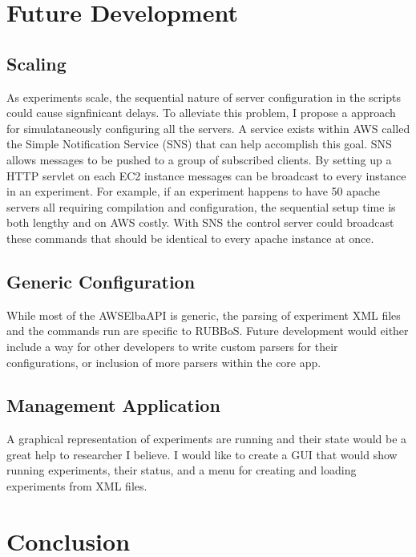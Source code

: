 \documentclass{article}
\begin{document}
\section{Future Development}
\subsection{Scaling}
As experiments scale, the sequential nature of server configuration in the scripts could cause signfinicant delays. To alleviate this problem, I propose a approach for simulataneously configuring all the servers.
A service exists within AWS called the Simple Notification Service (SNS) that can help accomplish this goal. SNS allows messages to be pushed to a group of subscribed clients. By setting up a HTTP servlet on each EC2 instance messages can be broadcast to every instance in an experiment. For example, if an experiment happens to have 50 apache servers all requiring compilation and configuration, the sequential setup time is both lengthy and on AWS costly. With SNS the control server could broadcast these commands that should be identical to every apache instance at once.
\subsection{Generic Configuration}
While most of the AWSElbaAPI is generic, the parsing of experiment XML files and the commands run are specific to RUBBoS. Future development would either include a way for other developers to write custom parsers for their configurations, or inclusion of more parsers within the core app.
\subsection{Management Application}
A graphical representation of experiments are running and their state would be a great help to researcher I believe. I would like to create a GUI that would show running experiments, their status, and a menu for creating and loading experiments from XML files.
\section{Conclusion}



\end{document}
